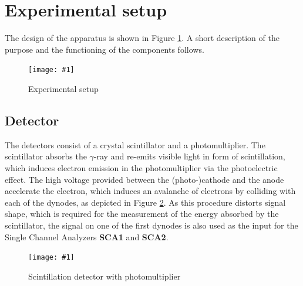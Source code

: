 \documentclass[twocolumn]{article}
\newcommand{\insertFigure}[1]{%
   \texttt{[image: \#1]}%
}
\begin{document}
\section{Experimental setup}
The design of the apparatus is shown in Figure \ref{fig:exp_setup}. A short description of the purpose and the functioning of the components follows.
\begin{figure}[!h]
\centering
\insertFigure{k223_setup.png}
\caption{Experimental setup \cite{booklet}}
\label{fig:exp_setup}
\end{figure}
\subsection{Detector}
The detectors consist of a crystal scintillator and a photomultiplier. The scintillator absorbs the $\gamma$-ray and re-emits visible light in form of scintillation, which induces electron emission in the photomultiplier via the photoelectric effect. The high voltage provided between the (photo-)cathode and the anode accelerate the electron, which induces an avalanche of electrons by colliding with each of the dynodes, as depicted in Figure \ref{fig:pmt}. As this procedure distorts signal shape, which is required for the measurement of the energy absorbed by the scintillator, the signal on one of the first dynodes is also used as the input for the Single Channel Analyzers \textbf{SCA1} and \textbf{SCA2}.
\begin{figure}[!h]
\centering
\insertFigure{pmt.png} %
\caption{Scintillation detector with photomultiplier \cite{pmt}} 
\label{fig:pmt}
\end{figure}
\end{document}
